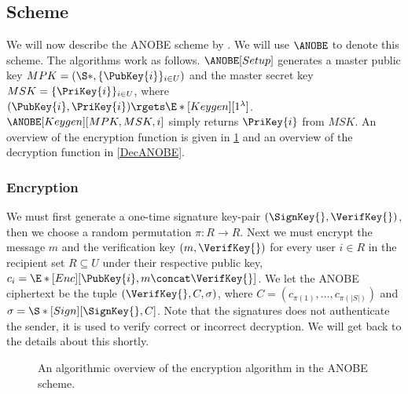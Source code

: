 \subsection{ Scheme}\label{ANOBE}

We will now describe the \ac{ANOBE} scheme by \citet{ANOBE}.
We will use \(\ANOBE\) to denote this scheme.
The algorithms work as follows.
\(\ANOBE[Setup]\) generates a master public key \(MPK = (\S*, \{\PubKey{i}\}_{i\in
    U})\) and the master secret key \(MSK = \{\PriKey{i}\}_{i\in U}\), where 
\((\PubKey{i}, \PriKey{i})\rgets \E*[Keygen][1^\lambda]\).
\(\ANOBE[Keygen][MPK, MSK, i]\) simply returns \(\PriKey{i}\) from \(MSK\).
An overview of the encryption function is given in \cref{EncANOBE} and an 
overview of the decryption function in \cref{DecANOBE}.

\subsubsection{Encryption}

We must first generate a one-time signature key-pair \((\SignKey{}, 
  \VerifKey{})\), then we choose a random permutation \(\pi\colon R\to R\).
Next we must encrypt the message \(m\) and the verification key \((m, 
  \VerifKey{})\) for every user \(i\in R\) in the recipient set \(R\subseteq 
  U\) under their respective public key, \(c_{i} = \E*[Enc][\PubKey{i}, 
  m\concat \VerifKey{}]\).
We let the \ac{ANOBE} ciphertext be the tuple \((\VerifKey{}, C, \sigma)\), 
where
\(C = ( c_{\pi(1)}, \ldots, c_{\pi({|S|})})\) and
\(\sigma = \S*[Sign][\SignKey{}, C ]\).
Note that the signatures does not authenticate the sender, it is used to verify 
correct or incorrect decryption.
We will get back to the details about this shortly.

\begin{frame}
  \begin{figure}
    \caption{%
      An algorithmic overview of the encryption algorithm in the \ac{ANOBE} 
      scheme.
    }\label{EncANOBE}
  \end{figure}
\end{frame}


